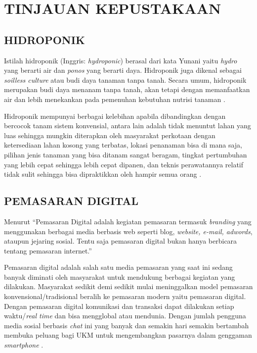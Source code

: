 \fancyhf{} 
\fancyfoot[C]{\thepage}
\chapter{TINJAUAN KEPUSTAKAAN}               

\section{\uppercase{Hidroponik}}
Istilah hidroponik (Inggris: \textit{hydroponic}) berasal dari kata Yunani yaitu \textit{hydro} yang berarti air dan \textit{ponos} yang berarti daya. Hidroponik juga dikenal sebagai \textit{soilless culture} atau budi daya tanaman tanpa tanah. Secara umum, hidroponik merupakan budi daya menanam tanpa tanah, akan tetapi dengan memanfaatkan air dan lebih menekankan pada pemenuhan kebutuhan nutrisi tanaman \citep{alviani2015bertanam}.

\par Hidroponik mempunyai berbagai kelebihan apabila dibandingkan dengan bercocok tanam sistem konvensial, antara lain adalah tidak menuntut lahan yang luas sehingga mungkin diterapkan oleh masyarakat perkotaan dengan ketersediaan lahan kosong yang terbatas, lokasi penanaman bisa di mana saja, pilihan jenis tanaman yang bisa ditanam sangat beragam, tingkat pertumbuhan yang lebih cepat sehingga lebih cepat dipanen, dan teknis perawatannya relatif tidak sulit sehingga bisa dipraktikkan oleh hampir semua orang \citep{iqbal2016simpel}.

\section{\uppercase{Pemasaran Digital}}
Menurut \citep{tarigan2013creative} “Pemasaran Digital adalah kegiatan pemasaran termasuk \textit{branding} yang menggunakan berbagai media berbasis web seperti blog, \textit{website, e-mail, adwords}, ataupun jejaring sosial. Tentu saja pemasaran digital bukan hanya berbicara tentang pemasaran internet.”

Pemasaran digital adalah salah satu media pemasaran yang saat ini sedang banyak diminati oleh masyarakat untuk mendukung berbagai kegiatan yang dilakukan. Masyarakat sedikit demi sedikit mulai meninggalkan model pemasaran konvensional/tradisional beralih ke pemasaran modern yaitu pemasaran digital. Dengan pemasaran digital komunikasi dan transaksi dapat dilakukan setiap waktu/\textit{real time} dan bisa mengglobal atau mendunia. Dengan jumlah pengguna media sosial berbasis \textit{chat} ini yang banyak dan semakin hari semakin bertambah membuka peluang bagi UKM untuk mengembangkan pasarnya dalam genggaman \textit{smartphone} \citep{pradiani2017pengaruh}.

